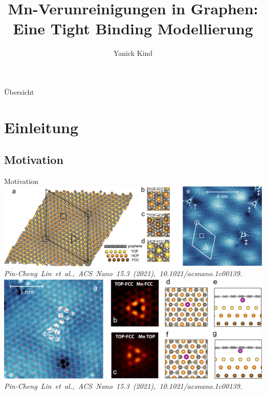 \documentclass[aspectratio=1610, 9pt]{beamer}
\title{Mn-Verunreinigungen in Graphen: Eine
Tight Binding Modellierung}
\author[Y.~Kind]{Yanick Kind}
\institute[AG Anders]{AG Anders \\  Fakultät Physik}
\begin{document}
\maketitle

\begin{frame}{Übersicht}
  \tableofcontents
\end{frame}

\section{Einleitung}
\subsection{Motivation}
\begin{frame}[allowframebreaks]{Motivation}
  \vspace*{1cm}
  \centering
  \includegraphics[width = \textwidth]{Plots/images_large_nn1c00139_0002.jpeg}
  \hspace*{15pt}\hbox{\scriptsize {\small\itshape Pin-Cheng Lin et al., \textit{ACS Nano 15.3 (2021)},  10.1021/acsnano.1c00139. }}
\newpage
  \centering
  \includegraphics[width = \textwidth]{Plots/images_large_nn1c00139_0003.jpeg}
  \hspace*{15pt}\hbox{\scriptsize {\small\itshape Pin-Cheng Lin et al., \textit{ACS Nano 15.3 (2021)},  10.1021/acsnano.1c00139. }}
\end{frame}
\end{document}
